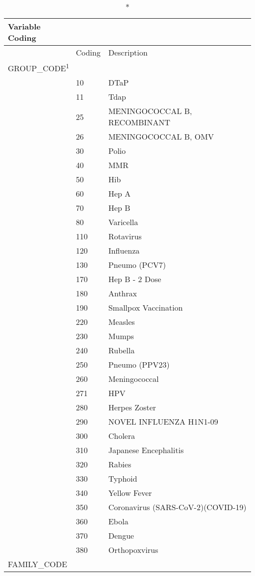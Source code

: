 \documentclass[
  letterpaper,
  DIV=11,
  numbers=noendperiod]{scrreprt}
\begin{document}
\setlength{\LTpost}{0mm}
\begin{longtable}{l|ll}
\caption*{
{\large Variable Coding}
} \\ 
\toprule
\multicolumn{1}{l}{} & Coding & Description \\ 
\midrule
\multicolumn{3}{l}{GROUP\_CODE\textsuperscript{1}} \\ 
\midrule
  & 10 & DTaP \\ 
  & 11 & Tdap \\ 
  & 25 & MENINGOCOCCAL B, RECOMBINANT \\ 
  & 26 & MENINGOCOCCAL B, OMV \\ 
  & 30 & Polio \\ 
  & 40 & MMR \\ 
  & 50 & Hib \\ 
  & 60 & Hep A \\ 
  & 70 & Hep B \\ 
  & 80 & Varicella \\ 
  & 110 & Rotavirus \\ 
  & 120 & Influenza \\ 
  & 130 & Pneumo (PCV7) \\ 
  & 170 & Hep B - 2 Dose \\ 
  & 180 & Anthrax \\ 
  & 190 & Smallpox Vaccination \\ 
  & 220 & Measles \\ 
  & 230 & Mumps \\ 
  & 240 & Rubella \\ 
  & 250 & Pneumo (PPV23) \\ 
  & 260 & Meningococcal \\ 
  & 271 & HPV \\ 
  & 280 & Herpes Zoster \\ 
  & 290 & NOVEL INFLUENZA H1N1-09 \\ 
  & 300 & Cholera \\ 
  & 310 & Japanese Encephalitis \\ 
  & 320 & Rabies \\ 
  & 330 & Typhoid \\ 
  & 340 & Yellow Fever \\ 
  & 350 & Coronavirus (SARS-CoV-2)(COVID-19) \\ 
  & 360 & Ebola \\ 
  & 370 & Dengue \\ 
  & 380 & Orthopoxvirus \\ 
\midrule
\multicolumn{3}{l}{FAMILY\_CODE} \\ 

\end{longtable}
\end{document}
